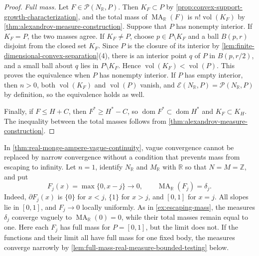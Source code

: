 \begin{proof}
\emph{Full mass.} Let $F\in\mathcal P(N_{\mathbb R},P)$. Then $K_F\subset P$ by \cref{prop:convex-support-growth-characterization}, and the total mass of $\operatorname{MA}_{\mathbb R}(F)$ is $n!\operatorname{vol}(K_F)$ by \cref{thm:alexandrov-measure-construction}. Suppose that $P$ has nonempty interior. If $K_F=P$, the two masses agree. If $K_F\neq P$, choose $p\in P\setminus K_F$ and a ball $B(p,r)$ disjoint from the closed set $K_F$. Since $P$ is the closure of its interior by \cref{lem:finite-dimensional-convex-separation}(4), there is an interior point $q$ of $P$ in $B(p,r/2)$, and a small ball about $q$ lies in $P\setminus K_F$. Hence $\operatorname{vol}(K_F)<\operatorname{vol}(P)$. This proves the equivalence when $P$ has nonempty interior. If $P$ has empty interior, then $n>0$, both $\operatorname{vol}(K_F)$ and $\operatorname{vol}(P)$ vanish, and $\mathcal E(N_{\mathbb R},P)=\mathcal P(N_{\mathbb R},P)$ by definition, so the equivalence holds as well.

Finally, if $F\leq H+C$, then $F^*\geq H^*-C$, so $\operatorname{dom}F^*\subset\operatorname{dom}H^*$ and $K_F\subset K_H$. The inequality between the total masses follows from \cref{thm:alexandrov-measure-construction}.
\end{proof}

\begin{example}\label{ex:real-mass-escaping-to-infinity}
In \cref{thm:real-monge-ampere-vague-continuity}, vague convergence cannot be replaced by narrow convergence without a condition that prevents mass from escaping to infinity. Let $n=1$, identify $N_{\mathbb R}$ and $M_{\mathbb R}$ with $\mathbb R$ so that $N=M=\mathbb Z$, and put
\[
 F_j(x)=\max\{0,x-j\}\longrightarrow0,
       \qquad\operatorname{MA}_{\mathbb R}(F_j)=\delta_j.
\]
Indeed, $\partial F_j(x)$ is $\{0\}$ for $x<j$, $\{1\}$ for $x>j$, and $[0,1]$ for $x=j$. All slopes lie in $[0,1]$, and $F_j\to0$ locally uniformly. As in \cref{ex:escaping-mass}, the measures $\delta_j$ converge vaguely to $\operatorname{MA}_{\mathbb R}(0)=0$, while their total masses remain equal to one. Here each $F_j$ has full mass for $P=[0,1]$, but the limit does not. If the functions and their limit all have full mass for one fixed body, the measures converge narrowly by \cref{lem:full-mass-real-measure-bounded-testing} below.
\end{example}

